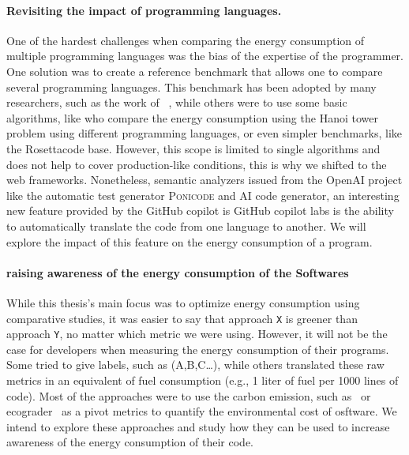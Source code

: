 \paragraph{Revisiting the impact of programming languages.}
One of the hardest challenges when comparing the energy consumption of multiple programming languages was the bias of the expertise of the programmer.
One solution was to create a reference benchmark that allows one to compare several programming languages.
This benchmark has been adopted by many researchers, such as the work of \citeauthor{couto2017towards}~\cite{couto2017towards}, while others were to use some basic algorithms, like \cite{noureddine_preliminary_2012} who compare the energy consumption using the Hanoi tower problem using different programming languages, or even simpler benchmarks, like the Rosettacode base.
However, this scope is limited to single algorithms and does not help to cover production-like conditions, this is why we shifted to the web frameworks.
Nonetheless, semantic analyzers issued from the OpenAI project like the automatic test generator \textsc{Ponicode} and AI code generator, an interesting new feature provided by the GitHub copilot is GitHub copilot labs is the ability to automatically translate the code from one language to another.
We will explore the impact of this feature on the energy consumption of a program.


\paragraph{raising awareness of the energy consumption of the Softwares}
While this thesis's main focus was to optimize energy consumption using comparative studies, it was easier to say that approach \texttt{X} is greener than approach \texttt{Y}, no matter which metric we were using.
However, it will not be the case for developers when measuring the energy consumption of their programs.
Some tried to give labels, such as (A,B,C\dots), while others translated these raw metrics in an equivalent of fuel consumption (e.g., 1 liter of fuel per 1000 lines of code).
Most of the approaches were to use the carbon emission, such as~\cite{patterson2021carbon} or ecograder~ as a pivot metrics to quantify the environmental cost of osftware.
We intend to explore these approaches and study how they can be used to increase awareness of the energy consumption of their code.



